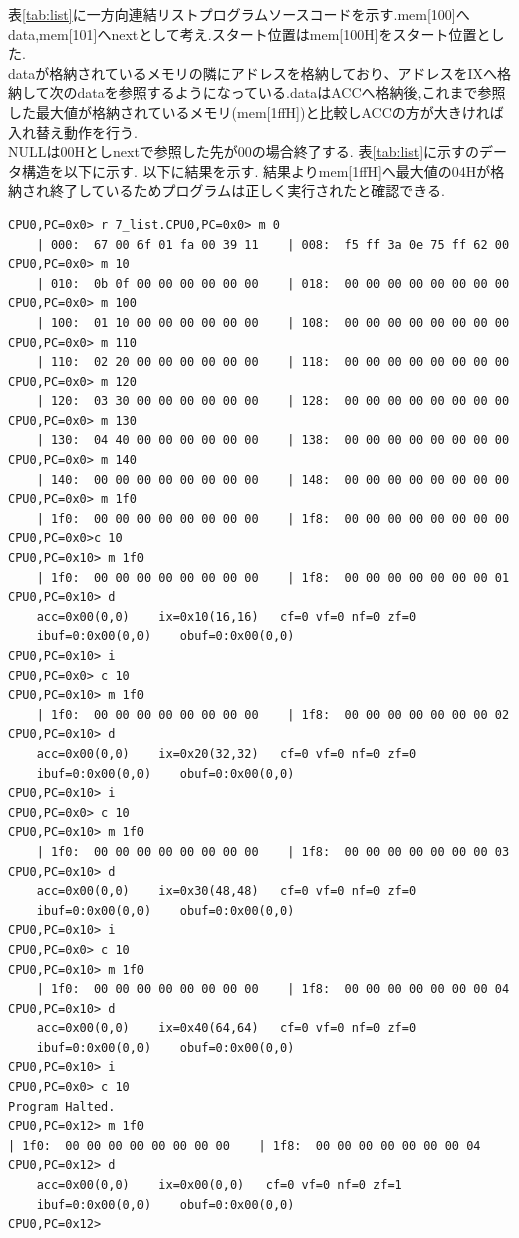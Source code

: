 \documentclass[dvipdfmx]{jsarticle}
\begin{document}
表\ref{tab:list}に一方向連結リストプログラムソースコードを示す.mem[100]へdata,mem[101]へnextとして考え.スタート位置はmem[100H]をスタート位置とした.\\
dataが格納されているメモリの隣にアドレスを格納しており、アドレスをIXへ格納して次のdataを参照するようになっている.dataはACCへ格納後,これまで参照した最大値が格納されているメモリ(mem[1ffH])と比較しACCの方が大きければ入れ替え動作を行う.\\
NULLは00Hとしnextで参照した先が00の場合終了する.
表\ref{tab:list}に示すのデータ構造を以下に示す.
\newpage
以下に結果を示す.
結果よりmem[1ffH]へ最大値の04Hが格納され終了しているためプログラムは正しく実行されたと確認できる.
      \begin{verbatim}
CPU0,PC=0x0> r 7_list.CPU0,PC=0x0> m 0
    | 000:  67 00 6f 01 fa 00 39 11    | 008:  f5 ff 3a 0e 75 ff 62 00
CPU0,PC=0x0> m 10
    | 010:  0b 0f 00 00 00 00 00 00    | 018:  00 00 00 00 00 00 00 00
CPU0,PC=0x0> m 100
    | 100:  01 10 00 00 00 00 00 00    | 108:  00 00 00 00 00 00 00 00
CPU0,PC=0x0> m 110
    | 110:  02 20 00 00 00 00 00 00    | 118:  00 00 00 00 00 00 00 00
CPU0,PC=0x0> m 120
    | 120:  03 30 00 00 00 00 00 00    | 128:  00 00 00 00 00 00 00 00
CPU0,PC=0x0> m 130
    | 130:  04 40 00 00 00 00 00 00    | 138:  00 00 00 00 00 00 00 00
CPU0,PC=0x0> m 140
    | 140:  00 00 00 00 00 00 00 00    | 148:  00 00 00 00 00 00 00 00
CPU0,PC=0x0> m 1f0
    | 1f0:  00 00 00 00 00 00 00 00    | 1f8:  00 00 00 00 00 00 00 00
CPU0,PC=0x0>c 10
CPU0,PC=0x10> m 1f0
    | 1f0:  00 00 00 00 00 00 00 00    | 1f8:  00 00 00 00 00 00 00 01
CPU0,PC=0x10> d
	acc=0x00(0,0)    ix=0x10(16,16)   cf=0 vf=0 nf=0 zf=0
	ibuf=0:0x00(0,0)    obuf=0:0x00(0,0)
CPU0,PC=0x10> i
CPU0,PC=0x0> c 10
CPU0,PC=0x10> m 1f0
    | 1f0:  00 00 00 00 00 00 00 00    | 1f8:  00 00 00 00 00 00 00 02
CPU0,PC=0x10> d
	acc=0x00(0,0)    ix=0x20(32,32)   cf=0 vf=0 nf=0 zf=0
	ibuf=0:0x00(0,0)    obuf=0:0x00(0,0)
CPU0,PC=0x10> i
CPU0,PC=0x0> c 10
CPU0,PC=0x10> m 1f0
    | 1f0:  00 00 00 00 00 00 00 00    | 1f8:  00 00 00 00 00 00 00 03
CPU0,PC=0x10> d
	acc=0x00(0,0)    ix=0x30(48,48)   cf=0 vf=0 nf=0 zf=0
	ibuf=0:0x00(0,0)    obuf=0:0x00(0,0)
CPU0,PC=0x10> i
CPU0,PC=0x0> c 10
CPU0,PC=0x10> m 1f0
    | 1f0:  00 00 00 00 00 00 00 00    | 1f8:  00 00 00 00 00 00 00 04
CPU0,PC=0x10> d
	acc=0x00(0,0)    ix=0x40(64,64)   cf=0 vf=0 nf=0 zf=0
	ibuf=0:0x00(0,0)    obuf=0:0x00(0,0)
CPU0,PC=0x10> i
CPU0,PC=0x0> c 10
Program Halted.
CPU0,PC=0x12> m 1f0
| 1f0:  00 00 00 00 00 00 00 00    | 1f8:  00 00 00 00 00 00 00 04
CPU0,PC=0x12> d
	acc=0x00(0,0)    ix=0x00(0,0)   cf=0 vf=0 nf=0 zf=1
	ibuf=0:0x00(0,0)    obuf=0:0x00(0,0)
CPU0,PC=0x12>

      \end{verbatim}
\end{document}
